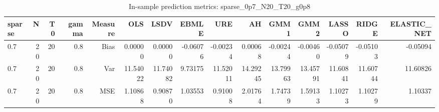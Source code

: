 \begin{table}[!htbp]\centering
\caption{In-sample prediction metrics: sparse_0p7_N20_T20_g0p8}
\label{tab:table2_sparse_0p7_N20_T20_g0p8}
\begin{tabular}{lrrrrrrrrrrrrrr}
\hline
sparse & N & T0 & gamma & Measure & OLS & LSDV & EBMLE & URE & AH & GMM1 & GMM2 & LASSO & RIDGE & ELASTIC_NET \\
\hline
0.7 & 20 & 20 & 0.8 & Bias & 0.00000 & 0.00000 & -0.06076 & -0.00234 & 0.00068 & -0.00244 & -0.00460 & -0.05079 & -0.05103 & -0.05094 \\
0.7 & 20 & 20 & 0.8 & Var & 11.54022 & 11.74082 & 9.73175 & 11.52011 & 14.29245 & 13.79963 & 13.45791 & 11.60841 & 11.60744 & 11.60826 \\
0.7 & 20 & 20 & 0.8 & MSE & 1.10868 & 0.90870 & 1.03553 & 0.91008 & 2.01764 & 1.74739 & 1.59133 & 1.10273 & 1.10279 & 1.10337 \\
\hline
\end{tabular}
\end{table}

